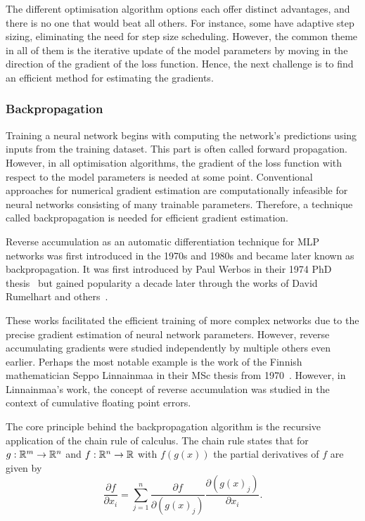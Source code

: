 The different optimisation algorithm options each offer distinct advantages, and there is no one that would beat all others.
For instance, some have adaptive step sizing, eliminating the need for step size scheduling.
However, the common theme in all of them is the iterative update of the model parameters by moving in the direction of the gradient of the loss function.
Hence, the next challenge is to find an efficient method for estimating the gradients.

\subsubsection{Backpropagation}
Training a neural network begins with computing the network's predictions using inputs from the training dataset.
This part is often called forward propagation.
However, in all optimisation algorithms, the gradient of the loss function with respect to the model parameters is needed at some point.
Conventional approaches for numerical gradient estimation are computationally infeasible for neural networks consisting of many trainable parameters.
Therefore, a technique called backpropagation is needed for efficient gradient estimation.

Reverse accumulation as an automatic differentiation technique for MLP networks was first introduced in the 1970s and 1980s and became later known as backpropagation.
It was first introduced by Paul Werbos in their 1974 PhD thesis~\cite{werbos} but gained popularity a decade later through the works of David Rumelhart and others~\cite{rumelhartetal}.

These works facilitated the efficient training of more complex networks due to the precise gradient estimation of neural network parameters.
However, reverse accumulating gradients were studied independently by multiple others even earlier.
Perhaps the most notable example is the work of the Finnish mathematician Seppo Linnainmaa in their MSc thesis from 1970~\cite{linnainmaa}.
However, in Linnainmaa's work, the concept of reverse accumulation was studied in the context of cumulative floating point errors.

The core principle behind the backpropagation algorithm is the recursive application of the chain rule of calculus.
The chain rule states that for $g: \mathbb{R}^{m}\rightarrow \mathbb{R}^{n}$ and $f: \mathbb{R}^{n} \rightarrow \mathbb{R}$ with $f(g(x))$ the partial derivatives of $f$ are given by
\begin{equation*}
    \frac{\partial f}{\partial x_{i}} = \sum_{j = 1}^{n} \frac{\partial f}{\partial (g(x)_{j})} \frac{\partial (g(x)_{j})}{\partial x_{i}}.
\end{equation*}

